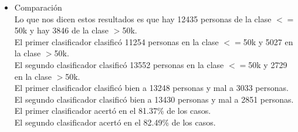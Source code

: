 \documentclass{article}
\begin{document}
\begin{itemize}
  \item Comparación\\
  Lo que nos dicen estos resultados es que hay 12435 personas de la clase $<=$50k y hay 3846 de la clase $>$50k.\\
  El primer clasificador clasificó 11254 personas en la clase $<=$50k y 5027 en la clase $>$50k.\\
  El segundo clasificador clasificó 13552 personas en la clase $<=$50k y 2729 en la clase $>$50k.\\
  El primer clasificador clasificó bien a 13248 personas y mal a 3033 personas.\\
  El segundo clasificador clasificó bien a 13430 personas y mal a 2851 personas.\\
  El primer clasificador acertó en el 81.37\% de los casos.\\
  El segundo clasificador acertó en el 82.49\% de los casos.\\
 \end{itemize}
 
\end{document}

